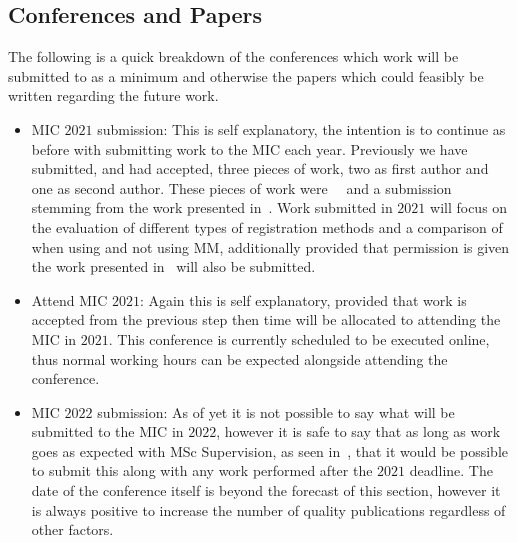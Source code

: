         \subsection{Conferences and Papers} \label{sec:future_work_conferences_and_papers}
            The following is a quick breakdown of the conferences which work will be submitted to as a minimum and otherwise the papers which could feasibly be written regarding the future work.
            
            \begin{itemize}
                \item \gls{MIC} $2021$ submission: This is self explanatory, the intention is to continue as before with submitting work to the \gls{MIC} each year. Previously we have submitted, and had accepted, three pieces of work, two as first author and one as second author. These pieces of work were~~ and a submission stemming from the work presented in~. Work submitted in $2021$ will focus on the evaluation of different types of registration methods and a comparison of when using and not using \gls{MM}, additionally provided that permission is given the work presented in~ will also be submitted.
                
                \item Attend \gls{MIC} $2021$: Again this is self explanatory, provided that work is accepted from the previous step then time will be allocated to attending the \gls{MIC} in $2021$. This conference is currently scheduled to be executed online, thus normal working hours can be expected alongside attending the conference.
    
                \item \gls{MIC} $2022$ submission: As of yet it is not possible to say what will be submitted to the \gls{MIC} in $2022$, however it is safe to say that as long as work goes as expected with \gls{MSc} Supervision, as seen in~, that it would be possible to submit this along with any work performed after the $2021$ deadline. The date of the conference itself is beyond the forecast of this section, however it is always positive to increase the number of quality publications regardless of other factors.
                

\end{itemize}
